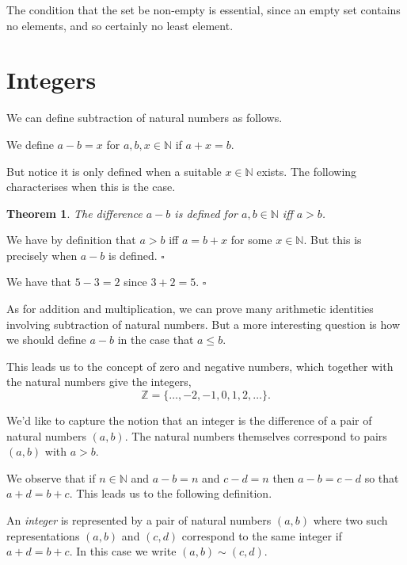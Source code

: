 \documentclass[10pt]{article}
\newcommand{\Z}{\mathbb{Z}}
\newcommand{\N}{\mathbb{N}}
\newcommand{\qed}{\square}
\newtheorem{theorem}{Theorem}[section]
\newenvironment{proof}[1][Proof]{\begin{trivlist}
\item[\hskip \labelsep {\bfseries #1}]}{\end{trivlist}}
\newenvironment{definition}[1][Definition]{\begin{trivlist}
\item[\hskip \labelsep {\bfseries #1}]}{\end{trivlist}}
\newenvironment{example}[1][Example]{\begin{trivlist}
\item[\hskip \labelsep {\bfseries #1}]}{\end{trivlist}}
\begin{document}
The condition that the set be non-empty is essential, since an empty set contains no elements, and so certainly no least element.

\section{Integers}

We can define subtraction of natural numbers as follows.

\begin{definition}
We define $a - b = x$ for $a, b, x \in \N$ if $a + x = b$.
\end{definition}

But notice it is only defined when a suitable $x \in \N$ exists. The following characterises when this is the case.

\begin{theorem}
The difference $a - b$ is defined for $a, b \in \N$ iff $a > b$.
\end{theorem}

\begin{proof}
We have by definition that $a > b$ iff $a = b + x$ for some $x \in \N$. But this is precisely when $a - b$ is defined. $\qed$
\end{proof}

\begin{example}
We have that $5 - 3 = 2$ since $3 + 2 = 5$. $\qed$
\end{example}

As for addition and multiplication, we can prove many arithmetic identities involving subtraction of natural numbers. But a more interesting question is how we should define $a - b$ in the case that $a \leq b$.

This leads us to the concept of zero and negative numbers, which together with the natural numbers give the integers, 
$$\Z = \{\ldots, -2, -1, 0, 1, 2, \ldots\}.$$

We'd like to capture the notion that an integer is the difference of a pair of natural numbers $(a, b)$. The natural numbers themselves correspond to pairs $(a, b)$ with $a > b$.

We observe that if $n \in \N$ and $a - b = n$ and $c - d = n$ then $a - b = c - d$ so that $a + d = b + c$. This leads us to the following definition.

\begin{definition}
An \emph{integer} is represented by a pair of natural numbers $(a, b)$ where two such representations $(a, b)$ and $(c, d)$ correspond to the same integer if $a + d = b + c$. In this case we write $(a, b) \sim (c, d)$.
\end{definition}
\end{document}
